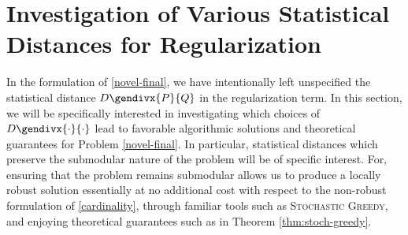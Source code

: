\documentclass[letter,11pt]{article}
\newcommand{\gendiv}{D\gendivx}
\begin{document}
\section{Investigation of Various Statistical Distances for Regularization}\label{sec:distances}
In the formulation of \eqref{novel-final}, we have intentionally left unspecified the statistical distance $\gendiv{P}{Q}$ in the regularization term. In this section, we will be specifically interested in investigating which choices of $\gendiv{\cdot}{\cdot}$ lead to favorable algorithmic solutions and theoretical guarantees for Problem \eqref{novel-final}. In particular, statistical distances which preserve the submodular nature of the problem will be of specific interest. For, ensuring that the problem remains submodular allows us to produce a locally robust solution essentially at no additional cost with respect to the non-robust formulation of \eqref{cardinality}, through familiar tools such as \textsc{Stochastic Greedy}, and enjoying theoretical guarantees such as in Theorem \ref{thm:stoch-greedy}.
\end{document}
